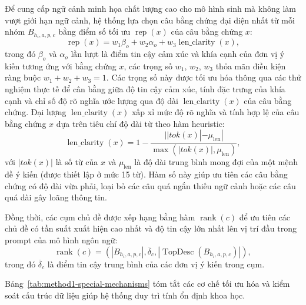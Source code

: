 Để cung cấp ngữ cảnh minh họa chất lượng cao cho mô hình sinh mà không làm vượt giới hạn ngữ cảnh, hệ thống lựa chọn câu bằng chứng đại diện nhất từ mỗi nhóm $B_{h_i,a,p,c}$ bằng điểm số tối ưu $\operatorname{rep}(x)$ của câu bằng chứng $x$:
\begin{equation}
\operatorname{rep}(x) = w_1 \beta_o + w_2 \alpha_o + w_3 \operatorname{len\_clarity}(x),
\label{eq:method1-representative-score}
\end{equation}
trong đó $\beta_o$ và $\alpha_o$ lần lượt là điểm tin cậy cảm xúc và khía cạnh của đơn vị ý kiến tương ứng với bằng chứng $x$, các trọng số $w_1$, $w_2$, $w_3$ thỏa mãn điều kiện ràng buộc $w_1 + w_2 + w_3 = 1$. Các trọng số này được tối ưu hóa thông qua các thử nghiệm thực tế để cân bằng giữa độ tin cậy cảm xúc, tính đặc trưng của khía cạnh và chỉ số độ rõ nghĩa ước lượng qua độ dài $\operatorname{len\_clarity}(x)$ của câu bằng chứng. Đại lượng $\operatorname{len\_clarity}(x)$ xấp xỉ mức độ rõ nghĩa và tính hợp lệ của câu bằng chứng $x$ dựa trên tiêu chí độ dài từ theo hàm heuristic:
\begin{equation}
\operatorname{len\_clarity}(x) = 1 - \frac{| |tok(x)| - \mu_{\mathrm{len}} |}{\max(|tok(x)|, \mu_{\mathrm{len}})},
\end{equation}
với $|tok(x)|$ là số từ của $x$ và $\mu_{\mathrm{len}}$ là độ dài trung bình mong đợi của một mệnh đề ý kiến (được thiết lập ở mức 15 từ). Hàm số này giúp ưu tiên các câu bằng chứng có độ dài vừa phải, loại bỏ các câu quá ngắn thiếu ngữ cảnh hoặc các câu quá dài gây loãng thông tin.

Đồng thời, các cụm chủ đề được xếp hạng bằng hàm $\operatorname{rank}(c)$ để ưu tiên các chủ đề có tần suất xuất hiện cao nhất và độ tin cậy lớn nhất lên vị trí đầu trong prompt của mô hình ngôn ngữ:
\begin{equation}
\operatorname{rank}(c) = \left( |B_{h_i,a,p,c}|, \overline{\delta}_{c}, |\operatorname{TopDesc}(B_{h_i,a,p,c})| \right),
\label{eq:method1-cluster-ranking-formula}
\end{equation}
trong đó $\overline{\delta}_c$ là điểm tin cậy trung bình của các đơn vị ý kiến trong cụm.

Bảng~\ref{tab:method1-special-mechanisms} tóm tắt các cơ chế tối ưu hóa và kiểm soát cấu trúc dữ liệu giúp hệ thống duy trì tính ổn định khoa học.

